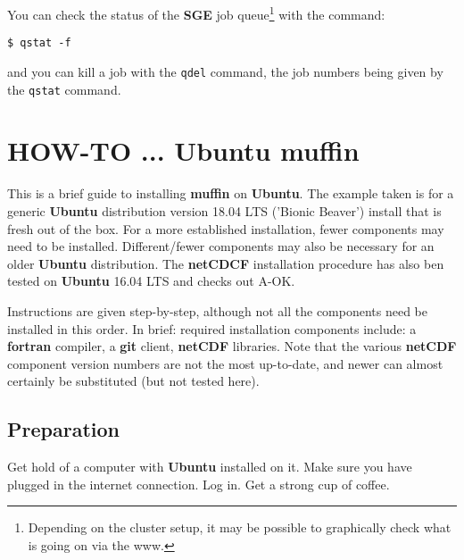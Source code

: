 \documentclass[11pt,fleqn]{book} %
\begin{document}
\begin{itemize}[noitemsep]
\end{itemize}

\noindent You can check the status of the \textbf{SGE} job queue\footnote{Depending on the cluster setup, it may be possible to graphically check what is going on via the www.} with the command:
\vspace{-2pt}\begin{verbatim}$ qstat -f\end{verbatim}\vspace{-2pt}
and you can kill a job with the \texttt{qdel} command, the job numbers being given by the \texttt{qstat} command.


\newpage


\section{HOW-TO ... Ubuntu muffin}\label{how-to-ubuntu}
\vspace{2mm}


This is a brief guide to installing \textbf{muffin} on \textbf{Ubuntu}. The example taken is for a generic \textbf{Ubuntu} distribution version 18.04 LTS ('Bionic Beaver') install that is fresh out of the box. For a more established installation, fewer components may need to be installed. Different/fewer components may also be necessary for an older \textbf{Ubuntu} distribution.
The \textbf{netCDCF} installation procedure has also ben tested on \textbf{Ubuntu} 16.04 LTS and checks out A-OK.

Instructions are given step-by-step, although not all the components need be installed in this order. In brief: required installation components include: a \textbf{fortran} compiler, a \textbf{git} client, \textbf{netCDF} libraries.
Note that the various \textbf{netCDF} component version numbers are not the most up-to-date, and newer can almost certainly be substituted (but not tested here).
%
\subsection*{Preparation}

Get hold of a computer with \textbf{Ubuntu} installed on it. Make sure you have plugged in the internet connection. Log in. Get a strong cup of coffee.
\end{document}
